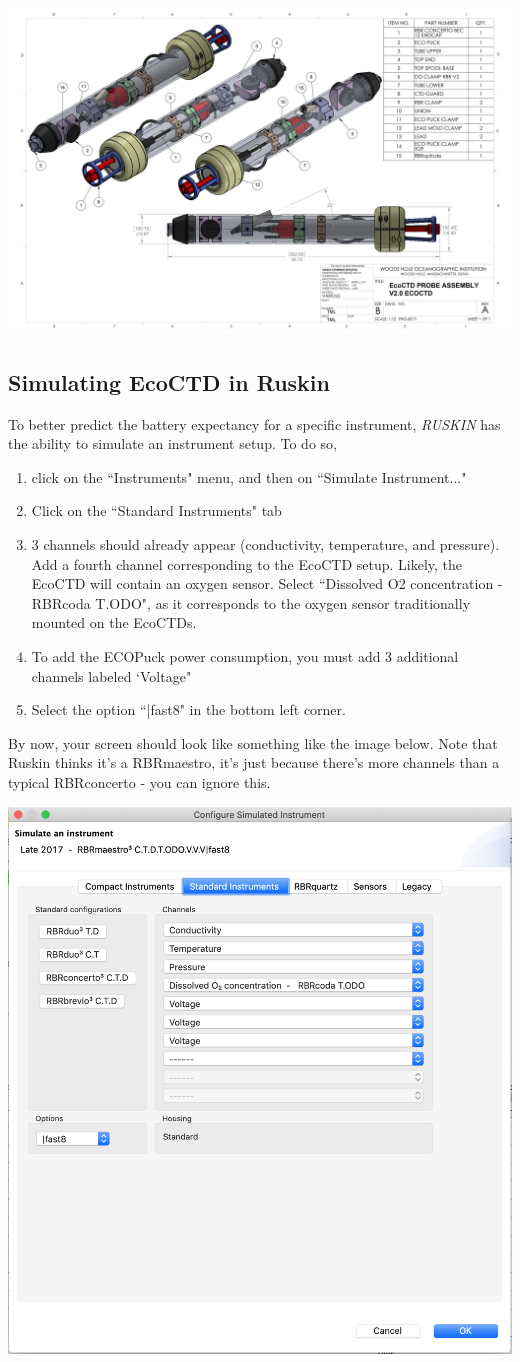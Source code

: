 \documentclass[13pt]{article}
\newcommand{\ruskin}{\textit{RUSKIN }}
\begin{document}
\begin{center}
    \includegraphics[width = .8\linewidth]{EcoCTD_engineer_diagram.png}
\end{center}

\subsection{Simulating EcoCTD in Ruskin}
To better predict the battery expectancy for a specific instrument, \ruskin has the ability to simulate an instrument setup. To do so, 
\begin{enumerate}
    \item click on the ``Instruments" menu, and then on ``Simulate Instrument..."
    \item Click on the ``Standard Instruments" tab
    \item 3 channels should already appear (conductivity, temperature, and pressure). Add a fourth channel corresponding to the EcoCTD setup. Likely, the EcoCTD will contain an oxygen sensor. Select ``Dissolved O2 concentration - RBRcoda T.ODO", as it corresponds to the oxygen sensor traditionally mounted on the EcoCTDs.
    \item To add the ECOPuck power consumption, you must add 3 additional channels labeled `Voltage"
    \item Select the option ``|fast8" in the bottom left corner. 
\end{enumerate}
By now, your screen should look like something like the image below. Note that Ruskin thinks it's a RBRmaestro, it's just because there's more channels than a typical RBRconcerto - you can ignore this.

\begin{center}
    \includegraphics[width = .5\linewidth]{EcocTD_simulation.png}
\end{center}
\end{document}

